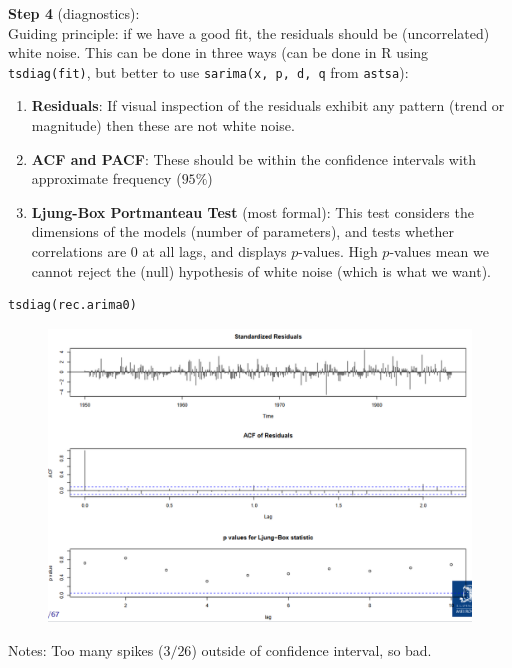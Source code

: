 \documentclass[11pt]{article}
\newcommand{\noi}{\noindent}
\begin{document}
\noi \textbf{Step 4} (diagnostics): \\
\noi Guiding principle: if we have a good fit, the residuals should be (uncorrelated) white noise. This can be done in three ways (can be done in R using \texttt{tsdiag(fit)}, but better to use \texttt{sarima(x, p, d, q} from \texttt{astsa}):
\begin{enumerate}
    \item \textbf{Residuals}: If visual inspection of the residuals exhibit any pattern (trend or magnitude) then these are not white noise.
    \item \textbf{ACF and PACF}: These should be within the confidence intervals with approximate frequency ($95\%$)
    \item \textbf{Ljung-Box Portmanteau Test} (most formal): This test considers the dimensions of the models (number of parameters), and tests whether correlations are $0$ at all lags, and displays $p$-values. High $p$-values mean we cannot reject the (null) hypothesis of white noise (which is what we want).
\end{enumerate}

\begin{lstlisting}
tsdiag(rec.arima0)
\end{lstlisting}
\begin{figure}[H]
    \centering
    \includegraphics[width=0.8\linewidth]{tsdiag results for Box-Jenkins Example.png}
\end{figure}
\noi Notes: Too many spikes ($3/26$) outside of confidence interval, so bad.
\end{document}
